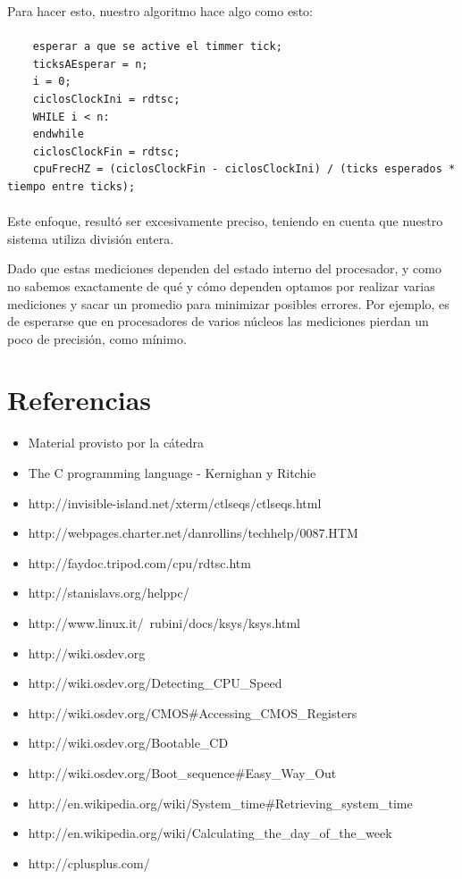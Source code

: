 \documentclass[a4paper,10pt]{article}
\begin{document}
    Para hacer esto, nuestro algoritmo hace algo como esto:
    \paragraph*{}
    \begin{lstlisting}
    esperar a que se active el timmer tick;
    ticksAEsperar = n;
    i = 0;
    ciclosClockIni = rdtsc;
    WHILE i < n:
    endwhile
    ciclosClockFin = rdtsc;
    cpuFrecHZ = (ciclosClockFin - ciclosClockIni) / (ticks esperados * tiempo entre ticks);
    \end{lstlisting}
    \paragraph*{}   
    Este enfoque, resultó ser excesivamente preciso, teniendo en cuenta que nuestro sistema utiliza división entera.

    Dado que estas mediciones dependen del estado interno del procesador, y como no sabemos exactamente de qué y cómo dependen optamos por realizar varias mediciones
    y sacar un promedio para minimizar posibles errores. Por ejemplo, es de esperarse que en procesadores de varios núcleos las mediciones
    pierdan un poco de precisión, como mínimo.

\newpage     
\section{Referencias}

\begin{itemize}
  \item Material provisto por la cátedra
  \item The C programming language - Kernighan y Ritchie
  \item http://invisible-island.net/xterm/ctlseqs/ctlseqs.html
  \item http://webpages.charter.net/danrollins/techhelp/0087.HTM
  \item http://faydoc.tripod.com/cpu/rdtsc.htm
  \item http://stanislavs.org/helppc/
  \item http://www.linux.it/~rubini/docs/ksys/ksys.html
  \item http://wiki.osdev.org
  \item http://wiki.osdev.org/Detecting\_CPU\_Speed
  \item	http://wiki.osdev.org/CMOS\#Accessing\_CMOS\_Registers
  \item http://wiki.osdev.org/Bootable\_CD
  \item http://wiki.osdev.org/Boot\_sequence\#Easy\_Way\_Out
  \item http://en.wikipedia.org/wiki/System\_time\#Retrieving\_system\_time
  \item http://en.wikipedia.org/wiki/Calculating\_the\_day\_of\_the\_week
  \item http://cplusplus.com/

\end{itemize}
   
\end{document}
